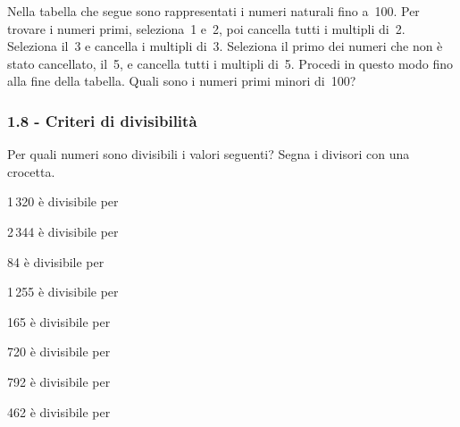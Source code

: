 \begin{esercizio}
\label{ese:1.16}
\begin{multicols}{2}
Nella tabella che segue sono rappresentati i numeri naturali fino a~100. Per trovare i
numeri primi, seleziona~1 e~2, poi cancella tutti i multipli di~2. Seleziona il~3 e cancella i multipli di~3. Seleziona il
primo dei numeri che non è stato cancellato, il~5, e cancella
tutti i multipli di~5. Procedi in questo modo fino alla fine
della tabella. Quali sono i numeri primi minori di~100?

\columnbreak\vfil

\end{multicols}
\end{esercizio}

\subsubsection*{1.8 - Criteri di divisibilità}
\begin{esercizio}
\label{ese:1.17}
 Per quali numeri sono divisibili i valori seguenti? Segna i divisori con una crocetta.
\TabPositions{3.5cm}
 \begin{enumeratea}
 \item 1\,320 è divisibile per \tab{}\:\:\:\:\:\:\:\:\:
 \item 2\,344 è divisibile per \tab{}\:\:\:\:\:\:\:\:\:
 \item 84 è divisibile per \tab{}\:\:\:\:\:\:\:\:\:
 \item 1\,255 è divisibile per \tab{}\:\:\:\:\:\:\:\:\:
 \item 165 è divisibile per \tab{}\:\:\:\:\:\:\:\:\:
 \item 720 è divisibile per \tab{}\:\:\:\:\:\:\:\:\:
 \item 792 è divisibile per \tab{}\:\:\:\:\:\:\:\:\:
 \item 462 è divisibile per \tab{}\:\:\:\:\:\:\:\:\:
 \end{enumeratea}
\end{esercizio}
